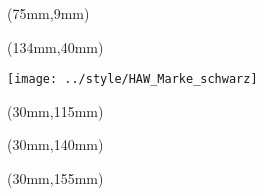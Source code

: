 %
%

\thispagestyle{empty}
\begin{titlepage}
{\selectfont

  \hfuzz=20pt
\begin{textblock*}{\textwidth}(75mm,9mm)
  \begin{minipage}[b][0cm][b]{\textwidth}
  \hfuzz=20pt
  \fontsize{16pt}{16pt}
  \selectfont
    \begin{flushleft}
    	  \IthesisNDAFull
    \end{flushleft}
  \end{minipage}
\end{textblock*}

\begin{textblock*}{\textwidth}(134mm,40mm)
  \begin{minipage}[b][0cm][b]{\textwidth}
    \texttt{[image: ../style/HAW\_Marke\_schwarz]}
  \end{minipage}
\end{textblock*}

\begin{textblock*}{\textwidth}(30mm,115mm)
  \begin{minipage}[b][0cm][b]{\textwidth}
    \fontsize{22pt}{20pt}
    \selectfont
  	\begin{flushright}
      \IthesisKind
  	\end{flushright}
  \end{minipage}
\end{textblock*}

\begin{textblock*}{\textwidth}(30mm,140mm)
  \begin{minipage}[b][0cm][b]{\textwidth}
  \fontsize{14pt}{20pt}
  \selectfont
    \begin{flushright}
      \IthesisAuthor
  	\end{flushright}
  \end{minipage}
\end{textblock*}

\begin{textblock*}{\textwidth}(30mm,155mm)
  \begin{minipage}[b][0cm][t]{\textwidth}
  \ITitleFontSize
  \selectfont
  	\begin{flushright}
       \IthesisTitle
  	\end{flushright}
  \end{minipage}
\end{textblock*}

}
\end{titlepage}
